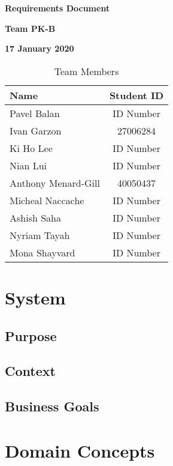\documentclass[12pt]{article}
\begin{document}
\vspace*{0.5in}
\centerline{\bf\Large Requirements Document}

\vspace*{0.5in}
\centerline{\bf\Large Team PK-B}

\vspace*{0.5in}
\centerline{\bf\Large 17 January 2020}

\vspace*{1.5in}
\begin{table}[htbp]
\caption{Team Members}
\begin{center}
\begin{tabular}{|l | c|}
\hline
Name & Student ID \\
\hline\hline
Pavel Balan & ID Number \\ \hline
Ivan Garzon & 27006284 \\ \hline
Ki Ho Lee & ID Number \\ \hline
Nian Lui & ID Number \\ \hline
Anthony Menard-Gill & 40050437 \\ \hline
Micheal Naccache & ID Number \\ \hline
Ashish Saha & ID Number \\ \hline
Nyriam Tayah & ID Number \\ \hline
Mona Shayvard & ID Number \\ \hline
\end{tabular}
\end{center}
\end{table}

\clearpage

\section{System}

\subsection{Purpose}

\subsection{Context}

\subsection{Business Goals}

\section{Domain Concepts}
\end{document}
